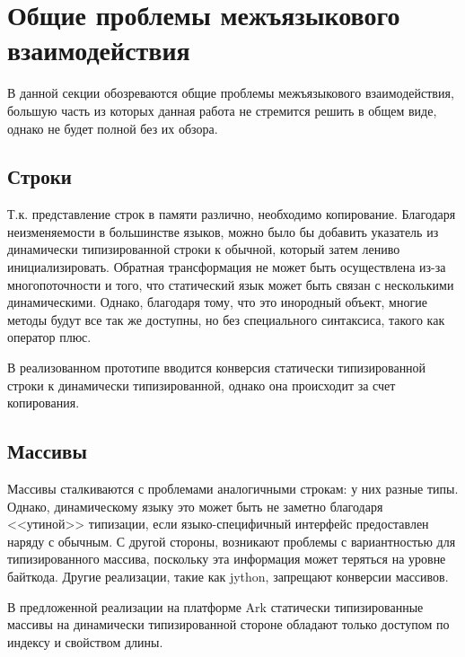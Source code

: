 \documentclass[times
]{itmo-student-thesis}
\begin{document}
\section{Общие проблемы межъязыкового взаимодействия}
В данной секции обозреваются общие проблемы межъязыкового взаимодействия, большую часть из которых данная работа не стремится решить в общем виде, однако не будет полной без их обзора.

\subsection{Строки}
Т.к. представление строк в памяти различно, необходимо копирование. Благодаря неизменяемости в большинстве языков, можно было бы добавить указатель из динамически типизированной строки к обычной, который затем лениво инициализировать. Обратная трансформация не может быть осуществлена из-за многопоточности и того, что статический язык может быть связан с несколькими динамическими. Однако, благодаря тому, что это инородный объект, многие методы будут все так же доступны, но без специального синтаксиса, такого как оператор плюс.

В реализованном прототипе вводится конверсия статически типизированной строки к динамически типизированной, однако она происходит за счет копирования.

\subsection{Массивы}
Массивы сталкиваются с проблемами аналогичными строкам: у них разные типы. Однако, динамическому языку это может быть не заметно благодаря <<утиной>> типизации, если языко-специфичный интерфейс предоставлен наряду с обычным. С другой стороны, возникают проблемы с вариантностью для типизированного массива, поскольку эта информация может теряться на уровне байткода. Другие реализации, такие как jython, запрещают конверсии массивов.

В предложенной реализации на платформе Ark статически типизированные массивы на динамически типизированной стороне обладают только доступом по индексу и свойством длины.
\end{document}
